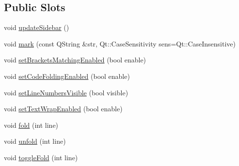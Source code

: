 \subsection*{Public Slots}
\begin{DoxyCompactItemize}
\item 
void \hyperlink{class_j_s_edit_ac51a3a9f7b1e8c5bc98b345bfc3d3b53}{update\+Sidebar} ()
\item 
void \hyperlink{class_j_s_edit_a8bf20e989fa0818d2bc32fefd4110821}{mark} (const Q\+String \&str, Qt\+::\+Case\+Sensitivity sens=Qt\+::\+Case\+Insensitive)
\item 
void \hyperlink{class_j_s_edit_aa06fb701194696f2b15f28b73dc60b6c}{set\+Brackets\+Matching\+Enabled} (bool enable)
\item 
void \hyperlink{class_j_s_edit_a3a90bd08f93058ab17d03fe8538802f4}{set\+Code\+Folding\+Enabled} (bool enable)
\item 
void \hyperlink{class_j_s_edit_aa4ebbca83d75bf65bd715f162d010e35}{set\+Line\+Numbers\+Visible} (bool visible)
\item 
void \hyperlink{class_j_s_edit_a4af6d6926d0f98c36432ba44bb080f8d}{set\+Text\+Wrap\+Enabled} (bool enable)
\item 
void \hyperlink{class_j_s_edit_a44ae8482351f716625bfbe42d0a1d5b3}{fold} (int line)
\item 
void \hyperlink{class_j_s_edit_a0bdd415108b84306f5c3b86b8e7de0b5}{unfold} (int line)
\item 
void \hyperlink{class_j_s_edit_ae2955b517e15a98c85252efef452ae8a}{toggle\+Fold} (int line)
\end{DoxyCompactItemize}
